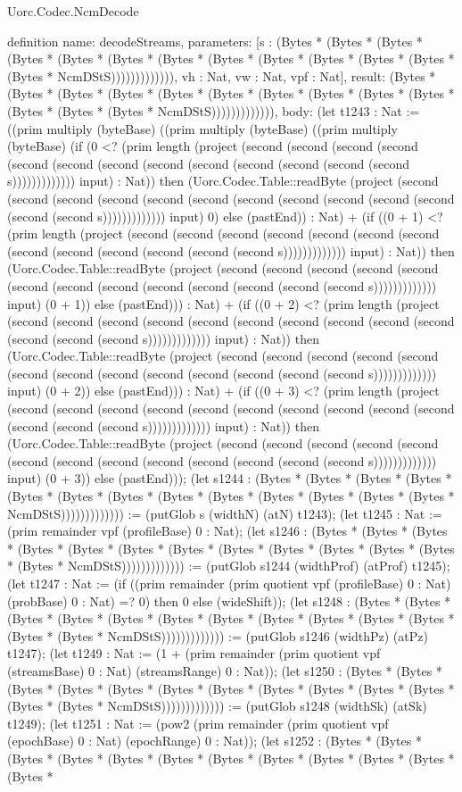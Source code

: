 \begin{lexlean}{Uorc.Codec.NcmDecode}
\begin{semanticmodule}
definition{
  name: decodeStreams,
  parameters: [s : (Bytes * (Bytes * (Bytes * (Bytes * (Bytes * (Bytes * (Bytes * (Bytes * (Bytes * (Bytes * (Bytes * (Bytes * (Bytes * NcmDStS))))))))))))), vh : Nat, vw : Nat, vpf : Nat],
  result: (Bytes * (Bytes * (Bytes * (Bytes * (Bytes * (Bytes * (Bytes * (Bytes * (Bytes * (Bytes * (Bytes * (Bytes * (Bytes * NcmDStS))))))))))))),
  body: (let t1243 : Nat := ((prim multiply (byteBase) ((prim multiply (byteBase) ((prim multiply (byteBase) (if (0 <? (prim length (project (second (second (second (second (second (second (second (second (second (second (second (second (second s))))))))))))) input) : Nat)) then (Uorc.Codec.Table::readByte (project (second (second (second (second (second (second (second (second (second (second (second (second (second s))))))))))))) input) 0) else (pastEnd)) : Nat) + (if ((0 + 1) <? (prim length (project (second (second (second (second (second (second (second (second (second (second (second (second (second s))))))))))))) input) : Nat)) then (Uorc.Codec.Table::readByte (project (second (second (second (second (second (second (second (second (second (second (second (second (second s))))))))))))) input) (0 + 1)) else (pastEnd))) : Nat) + (if ((0 + 2) <? (prim length (project (second (second (second (second (second (second (second (second (second (second (second (second (second s))))))))))))) input) : Nat)) then (Uorc.Codec.Table::readByte (project (second (second (second (second (second (second (second (second (second (second (second (second (second s))))))))))))) input) (0 + 2)) else (pastEnd))) : Nat) + (if ((0 + 3) <? (prim length (project (second (second (second (second (second (second (second (second (second (second (second (second (second s))))))))))))) input) : Nat)) then (Uorc.Codec.Table::readByte (project (second (second (second (second (second (second (second (second (second (second (second (second (second s))))))))))))) input) (0 + 3)) else (pastEnd))); (let s1244 : (Bytes * (Bytes * (Bytes * (Bytes * (Bytes * (Bytes * (Bytes * (Bytes * (Bytes * (Bytes * (Bytes * (Bytes * (Bytes * NcmDStS))))))))))))) := (putGlob s (widthN) (atN) t1243); (let t1245 : Nat := (prim remainder vpf (profileBase) 0 : Nat); (let s1246 : (Bytes * (Bytes * (Bytes * (Bytes * (Bytes * (Bytes * (Bytes * (Bytes * (Bytes * (Bytes * (Bytes * (Bytes * (Bytes * NcmDStS))))))))))))) := (putGlob s1244 (widthProf) (atProf) t1245); (let t1247 : Nat := (if ((prim remainder (prim quotient vpf (profileBase) 0 : Nat) (probBase) 0 : Nat) =? 0) then 0 else (wideShift)); (let s1248 : (Bytes * (Bytes * (Bytes * (Bytes * (Bytes * (Bytes * (Bytes * (Bytes * (Bytes * (Bytes * (Bytes * (Bytes * (Bytes * NcmDStS))))))))))))) := (putGlob s1246 (widthPz) (atPz) t1247); (let t1249 : Nat := (1 + (prim remainder (prim quotient vpf (streamsBase) 0 : Nat) (streamsRange) 0 : Nat)); (let s1250 : (Bytes * (Bytes * (Bytes * (Bytes * (Bytes * (Bytes * (Bytes * (Bytes * (Bytes * (Bytes * (Bytes * (Bytes * (Bytes * NcmDStS))))))))))))) := (putGlob s1248 (widthSk) (atSk) t1249); (let t1251 : Nat := (pow2 (prim remainder (prim quotient vpf (epochBase) 0 : Nat) (epochRange) 0 : Nat)); (let s1252 : (Bytes * (Bytes * (Bytes * (Bytes * (Bytes * (Bytes * (Bytes * (Bytes * (Bytes * (Bytes * (Bytes * (Bytes * }
\end{semanticmodule}
\end{lexlean}
